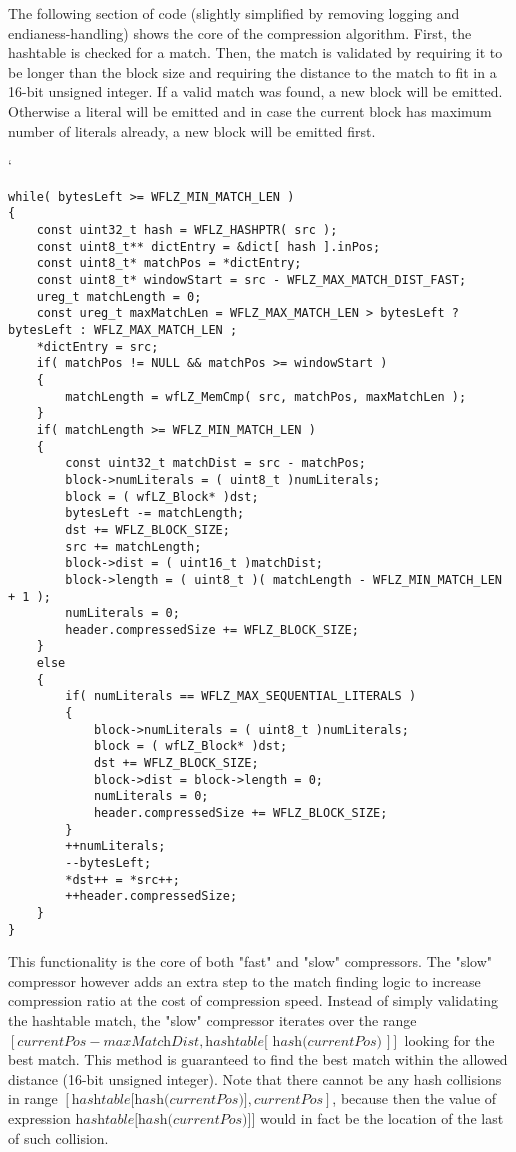 \documentclass[english]{tktltiki2}
\theoremstyle{definition}
\theoremstyle{remark}
\begin{document}
The following section of code (slightly simplified by removing logging and endianess-handling) shows the core of the compression algorithm. First, the hashtable is checked for a match. Then, the match is validated by requiring it to be longer than the block size and requiring the distance to the match to fit in a 16-bit unsigned integer. If a valid match was found, a new block will be emitted. Otherwise a literal will be emitted and in case the current block has maximum number of literals already, a new block will be emitted first.    

\begingroup
\catcode`
\begin{verbatim}
while( bytesLeft >= WFLZ_MIN_MATCH_LEN )
{
	const uint32_t hash = WFLZ_HASHPTR( src );
	const uint8_t** dictEntry = &dict[ hash ].inPos;
	const uint8_t* matchPos = *dictEntry;
	const uint8_t* windowStart = src - WFLZ_MAX_MATCH_DIST_FAST;
	ureg_t matchLength = 0;
	const ureg_t maxMatchLen = WFLZ_MAX_MATCH_LEN > bytesLeft ? bytesLeft : WFLZ_MAX_MATCH_LEN ;
	*dictEntry = src;
	if( matchPos != NULL && matchPos >= windowStart )
	{
		matchLength = wfLZ_MemCmp( src, matchPos, maxMatchLen );
	}
	if( matchLength >= WFLZ_MIN_MATCH_LEN )
	{
		const uint32_t matchDist = src - matchPos;
		block->numLiterals = ( uint8_t )numLiterals;
		block = ( wfLZ_Block* )dst;
		bytesLeft -= matchLength;
		dst += WFLZ_BLOCK_SIZE;
		src += matchLength;
		block->dist = ( uint16_t )matchDist;
		block->length = ( uint8_t )( matchLength - WFLZ_MIN_MATCH_LEN + 1 );
		numLiterals = 0;
		header.compressedSize += WFLZ_BLOCK_SIZE;
	}
	else
	{
		if( numLiterals == WFLZ_MAX_SEQUENTIAL_LITERALS )
		{
			block->numLiterals = ( uint8_t )numLiterals;
			block = ( wfLZ_Block* )dst;
			dst += WFLZ_BLOCK_SIZE;
			block->dist = block->length = 0;
			numLiterals = 0;
			header.compressedSize += WFLZ_BLOCK_SIZE;
		}
		++numLiterals;
		--bytesLeft;
		*dst++ = *src++;
		++header.compressedSize;
	}
}				
\end{verbatim}
\endgroup

This functionality is the core of both "fast" and "slow" compressors. The "slow" compressor however adds an extra step to the match finding logic to increase compression ratio at the cost of compression speed. Instead of simply validating the hashtable match, the "slow" compressor iterates over the range $[\textit{currentPos} - \textit{maxMatchDist}, \textit{hashtable[ hash(currentPos) ]}]$ looking for the best match. This method is guaranteed to find the best match within the allowed distance (16-bit unsigned integer). Note that there cannot be any hash collisions in range $[ \textit{hashtable[hash(currentPos)]}, \textit{currentPos} ]$, because then the value of expression $\textit{hashtable[hash(currentPos)]} ]$ would in fact be the location of the last of such collision.
\end{document}
